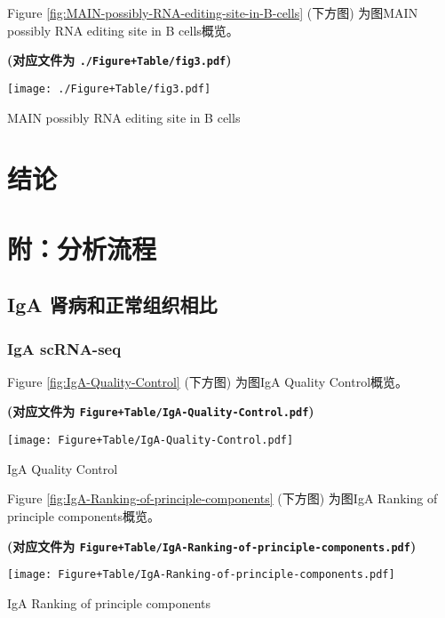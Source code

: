 \documentclass[
]{article}
\begin{document}
Figure \ref{fig:MAIN-possibly-RNA-editing-site-in-B-cells} (下方图) 为图MAIN possibly RNA editing site in B cells概览。

\textbf{(对应文件为 \texttt{./Figure+Table/fig3.pdf})}

\def\@captype{figure}
\begin{center}
\texttt{[image: ./Figure+Table/fig3.pdf]}
\caption{MAIN possibly RNA editing site in B cells}\label{fig:MAIN-possibly-RNA-editing-site-in-B-cells}
\end{center}

\hypertarget{dis}{%
\section{结论}\label{dis}}

\hypertarget{workflow}{%
\section{附：分析流程}\label{workflow}}

\hypertarget{iga-ux80beux75c5ux548cux6b63ux5e38ux7ec4ux7ec7ux76f8ux6bd4}{%
\subsection{IgA 肾病和正常组织相比}\label{iga-ux80beux75c5ux548cux6b63ux5e38ux7ec4ux7ec7ux76f8ux6bd4}}

\hypertarget{iga-scrna-seq}{%
\subsubsection{IgA scRNA-seq}\label{iga-scrna-seq}}

Figure \ref{fig:IgA-Quality-Control} (下方图) 为图IgA Quality Control概览。

\textbf{(对应文件为 \texttt{Figure+Table/IgA-Quality-Control.pdf})}

\def\@captype{figure}
\begin{center}
\texttt{[image: Figure+Table/IgA-Quality-Control.pdf]}
\caption{IgA Quality Control}\label{fig:IgA-Quality-Control}
\end{center}

Figure \ref{fig:IgA-Ranking-of-principle-components} (下方图) 为图IgA Ranking of principle components概览。

\textbf{(对应文件为 \texttt{Figure+Table/IgA-Ranking-of-principle-components.pdf})}

\def\@captype{figure}
\begin{center}
\texttt{[image: Figure+Table/IgA-Ranking-of-principle-components.pdf]}
\caption{IgA Ranking of principle components}\label{fig:IgA-Ranking-of-principle-components}
\end{center}
\end{document}
